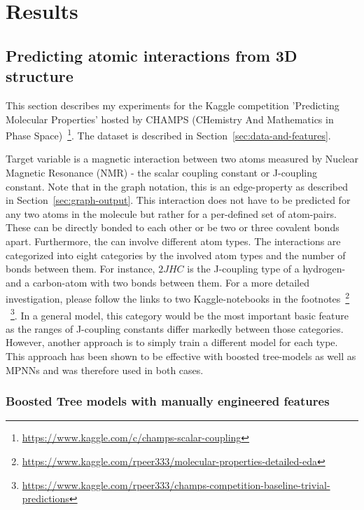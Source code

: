 \chapter{Results}
\label{chapter:Results}

\section{Predicting atomic interactions from 3D structure}
\label{sec:champs}

This section describes my experiments for the Kaggle competition 'Predicting Molecular Properties' hosted by CHAMPS (CHemistry And Mathematics in Phase Space)~\footnote{\url{https://www.kaggle.com/c/champs-scalar-coupling}}. The dataset is described in Section~\ref{sec:data-and-features}.

Target variable is a magnetic interaction between two atoms measured by Nuclear Magnetic Resonance (NMR) - the scalar coupling constant or J-coupling constant.
Note that in the graph notation, this is an edge-property as described in Section~\ref{sec:graph-output}. This interaction does not have to be predicted for any two atoms in the molecule but rather for a per-defined set of atom-pairs. These can be directly bonded to each other or be two or three covalent bonds apart. Furthermore, the can involve different atom types. The interactions are categorized into eight categories by the involved atom types and the number of bonds between them. For instance, $2JHC$ is the J-coupling type of a hydrogen- and a carbon-atom with two bonds between them. For a more detailed investigation, please follow the links to two Kaggle-notebooks in the footnotes~\footnote{\url{https://www.kaggle.com/rpeer333/molecular-properties-detailed-eda}}
	~\footnote{\url{https://www.kaggle.com/rpeer333/champs-competition-baseline-trivial-predictions}}.
In a general model, this category would be the most important basic feature as the ranges of J-coupling constants differ markedly between those categories. However, another approach is to simply train a different model for each type. This approach has been shown to be effective with boosted tree-models as well as MPNNs and was therefore used in both cases.



\subsection{Boosted Tree models with manually engineered features}
\label{sec:champs-boosted-tree}

